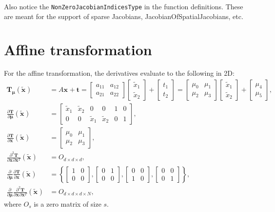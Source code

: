\documentclass[]{article}
\newcommand{\vT}{\bm{T}}
\newcommand{\vmu}{\bm{\mu}}
\newcommand{\vTmu}{\bm{T_{\mu}}}
\newcommand{\vx}[1][]{\bm{x}_{#1}}
\newcommand{\vxt}[1][]{\bm{\widetilde x}_{#1}}
\newcommand{\D}[2]{\frac{\partial #1}{\partial #2}}
\newcommand{\Dd}[3]{\frac{\partial^2 #1}{\partial #2 \partial #3}}
\begin{document}
Also notice the \texttt{NonZeroJacobianIndicesType} in the function
definitions. These are meant for the support of sparse Jacobians,
JacobianOfSpatialJacobians, etc.

\section{Affine transformation}

For the affine transformation, the derivatives evaluate to the
following in 2D:
\begin{align}
\vTmu(\vxt) &= A \vx + \bm{t} = \begin{bmatrix} a_{11} & a_{12}
\\ a_{21} & a_{22} \end{bmatrix} \begin{bmatrix} \widetilde x_1 \\
\widetilde x_2 \end{bmatrix} + \begin{bmatrix} t_1 \\ t_2
\end{bmatrix} = \begin{bmatrix} \mu_0 & \mu_1
\\ \mu_2 & \mu_3 \end{bmatrix} \begin{bmatrix} \widetilde x_1 \\
\widetilde x_2 \end{bmatrix} + \begin{bmatrix} \mu_4 \\ \mu_5
\end{bmatrix}, \\
\D{\vT}{\vmu}(\vxt) &= \begin{bmatrix} \widetilde x_1 & \widetilde
x_2 & 0 & 0 & 1 & 0 \\ 0 & 0 & \widetilde x_1 & \widetilde x_2 & 0 &
1 \end{bmatrix}, \\
\D{\vT}{\vx}(\vxt) &= \begin{bmatrix} \mu_0 & \mu_1 \\ \mu_2 & \mu_3 \end{bmatrix}, \\
\Dd{\vT}{\vx}{\vx^T}(\vxt) &= O_{d \times d \times d}, \\
\D{}{\vmu} \D{\vT}{\vx}(\vxt) &= \left\{ \begin{bmatrix} 1 & 0 \\
0 & 0 \end{bmatrix}, \begin{bmatrix} 0 & 1 \\ 0 & 0
\end{bmatrix}, \begin{bmatrix} 0 & 0 \\ 1 & 0
\end{bmatrix}, \begin{bmatrix} 0 & 0 \\ 0 & 1
\end{bmatrix} \right\}, \\
\D{}{\vmu} \Dd{\vT}{\vx}{\vx^T}(\vxt) &= O_{d \times d \times d
\times N},
\end{align}
where $O_s$ is a zero matrix of size $s$.
\end{document}
